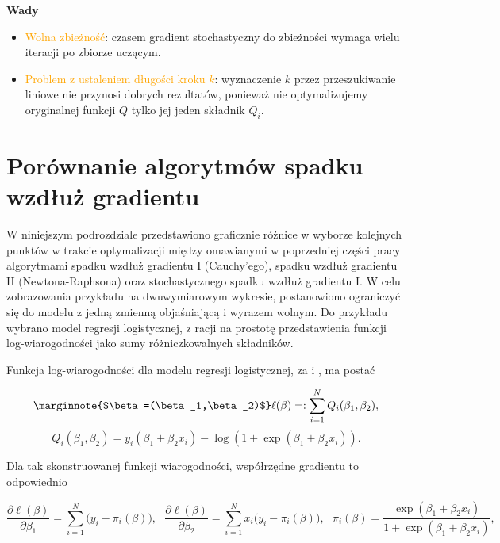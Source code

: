 \textbf{Wady}  \vspace{-5pt}
\begin{itemize}
\item \textcolor{orange}{Wolna zbieżność}: czasem gradient stochastyczny do zbieżności wymaga wielu iteracji po zbiorze uczącym.
\item \textcolor{orange}{Problem z ustaleniem długości kroku $k$}: wyznaczenie $k$
przez przeszukiwanie liniowe nie przynosi dobrych rezultatów,
ponieważ nie optymalizujemy oryginalnej funkcji $Q$ tylko jej jeden
składnik $Q_{i}$.
\end{itemize}
\newpage
\section{Porównanie algorytmów spadku wzdłuż gradientu}

W niniejszym podrozdziale przedstawiono graficznie różnice w wyborze kolejnych punktów w trakcie optymalizacji między omawianymi w poprzedniej części pracy algorytmami spadku wzdłuż gradientu I (Cauchy'ego), spadku wzdłuż gradientu II (Newtona-Raphsona) oraz stochastycznego spadku wzdłuż gradientu I. W celu zobrazowania przykładu na dwuwymiarowym wykresie, postanowiono ograniczyć się do modelu z jedną zmienną objaśniającą i wyrazem wolnym. Do przykładu wybrano model regresji logistycznej, z racji na prostotę przedstawienia funkcji log-wiarogodności jako sumy różniczkowalnych składników.

Funkcja log-wiarogodności dla modelu regresji logistycznej, za \cite{czepiel} i \cite{dobson}, ma postać

\begin{equation}\label{logglm}
\marginnote{$\beta=(\beta_1,\beta_2)$}
\ell(\beta) =: \sum\limits_{i=1}^{N} Q_i(\beta_1,\beta_2), 
\end{equation}
\begin{equation}
Q_i(\beta_1,\beta_2) = y_i(\beta_1+\beta_2x_i) -\log(1+\exp(\beta_1+\beta_2x_i)).
\end{equation}

Dla tak skonstruowanej funkcji wiarogodności, współrzędne gradientu to odpowiednio

\begin{equation*}
\dfrac{\partial\ell(\beta)}{\partial\beta_1} = \sum\limits_{i=1}^{N}\Big(y_i-\pi_i(\beta)\Big), \ \ \
\dfrac{\partial\ell(\beta)}{\partial\beta_2} = \sum\limits_{i=1}^{N}x_i\Big(y_i-\pi_i(\beta)\Big), \ \ \
\pi_i(\beta) = \frac{\exp(\beta_1+\beta_2x_i)}{1+\exp(\beta_1+\beta_2x_i)},
\end{equation*}

